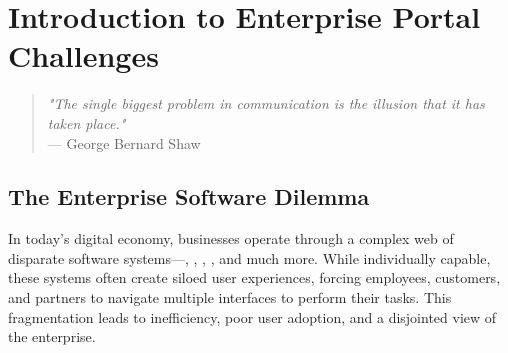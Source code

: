 
\chapter{Introduction to Enterprise Portal Challenges}
\label{chap:intro}

\begin{quote}
\textit{"The single biggest problem in communication is the illusion that it has taken place."} \\
— George Bernard Shaw
\end{quote}

\section{The Enterprise Software Dilemma}
\label{sec:enterprise-dilemma}

In today's digital economy, businesses operate through a complex web of disparate software systems—, , , , and much more. While individually capable, these systems often create siloed user experiences, forcing employees, customers, and partners to navigate multiple interfaces to perform their tasks. This fragmentation leads to inefficiency, poor user adoption, and a disjointed view of the enterprise.

